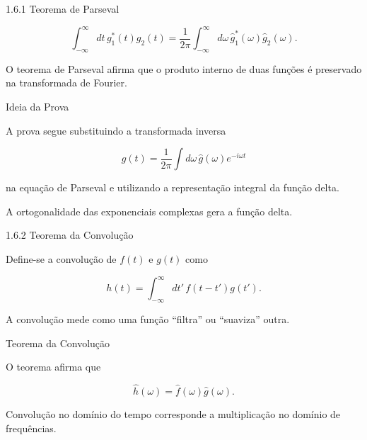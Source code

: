 \documentclass[aspectratio=169]{beamer}
\begin{document}


\begin{frame}{1.6.1 Teorema de Parseval}

\begin{equation}
\int_{-\infty}^{\infty} dt\, g_1^*(t) g_2(t)
=
\frac{1}{2\pi}
\int_{-\infty}^{\infty}
d\omega\,
\hat g_1^*(\omega)\hat g_2(\omega).
\tag{1.131}
\end{equation}

\begin{tcolorbox}[colback=blue!5,colframe=blue]
O teorema de Parseval afirma que o produto interno de duas funções
é preservado na transformada de Fourier.
\end{tcolorbox}

\end{frame}

\begin{frame}{Ideia da Prova}

A prova segue substituindo a transformada inversa

\[
g(t)=\frac{1}{2\pi}
\int d\omega\,\hat g(\omega)e^{-i\omega t}
\]

na equação de Parseval e utilizando a representação integral
da função delta.

\begin{tcolorbox}[colback=blue!5,colframe=blue]
A ortogonalidade das exponenciais complexas gera a função delta.
\end{tcolorbox}

\end{frame}

\begin{frame}{1.6.2 Teorema da Convolução}

Define-se a convolução de $f(t)$ e $g(t)$ como

\begin{equation}
h(t)=
\int_{-\infty}^{\infty}
dt'\,
f(t-t')g(t').
\tag{1.132}
\end{equation}

\begin{tcolorbox}[colback=blue!5,colframe=blue]
A convolução mede como uma função ``filtra'' ou
``suaviza'' outra.
\end{tcolorbox}

\end{frame}

\begin{frame}{Teorema da Convolução}

O teorema afirma que

\begin{equation}
\hat h(\omega)=\hat f(\omega)\hat g(\omega).
\tag{1.133}
\end{equation}

\begin{tcolorbox}[colback=blue!5,colframe=blue]
Convolução no domínio do tempo
corresponde a multiplicação no domínio de frequências.
\end{tcolorbox}

\end{frame}
\end{document}
